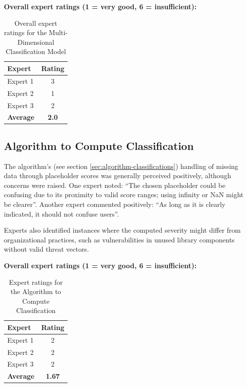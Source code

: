 \textbf{Overall expert ratings (1 = very good, 6 = insufficient):}
\\
\begin{table}[H]
\centering
\begin{tabular}{|l|c|}
    \hline
    Expert & Rating \\
    \hline
    Expert 1 & 3 \\
    Expert 2 & 1 \\
    Expert 3 & 2 \\
    \hline
    \textbf{Average} & \textbf{2.0} \\
    \hline
\end{tabular}
\caption{Overall expert ratings for the Multi-Dimensional Classification Model}
\label{tab:expert_ratings_multidimensional}
\end{table}

\subsection{Algorithm to Compute Classification}

The algorithm's (see section \ref{sec:algorithm-classifications})  handling of missing data through placeholder scores was generally perceived positively, although concerns were raised. One expert noted: \enquote{The chosen placeholder could be confusing due to its proximity to valid score ranges; using infinity or NaN might be clearer}. Another expert commented positively: \enquote{As long as it is clearly indicated, it should not confuse users}.

Experts also identified instances where the computed severity might differ from organizational practices, such as vulnerabilities in unused library components without valid threat vectors.

\textbf{Overall expert ratings (1 = very good, 6 = insufficient):}
\\
\begin{table}[H]
\centering
\begin{tabular}{|l|c|}
    \hline
    Expert & Rating \\
    \hline
    Expert 1 & 2 \\
    Expert 2 & 2 \\
    Expert 3 & 2 \\
    \hline
    \textbf{Average} & \textbf{1.67} \\
    \hline
\end{tabular}
\caption{Expert ratings for the Algorithm to Compute Classification}
\label{tab:expert_ratings_algorithm_classification}
\end{table}

